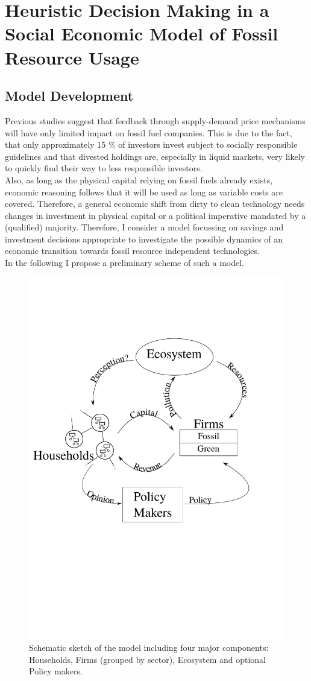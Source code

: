 \chapter{Heuristic Decision Making in a Social Economic Model of Fossil Resource Usage}
\section{Model Development} 

Previous studies \cite{Ans2013} suggest that feedback through supply-demand price mechanisms will have only limited impact on fossil fuel companies. This is due to the fact, that only approximately 15 \% of investors invest subject to socially responsible guidelines \cite{SIF2014Report} and that divested holdings are, especially in liquid markets, very likely to quickly find their way to less responsible investors. \\
Also, as long as the physical capital relying on fossil fuels already exists, economic reasoning follows that it will be used as long as variable costs are covered.
Therefore, a general economic shift from dirty to clean technology needs changes in investment in physical capital or a political imperative mandated by a (qualified) majority. Therefore, I consider a model focussing on savings and investment decisions appropriate to investigate the possible dynamics of an economic transition towards fossil resource independent technologies.\\
In the following I propose a preliminary scheme of such a model.

\begin{figure}[t]
	\centering
	\includegraphics[width =.7 \textwidth]{figures/Model_Scheme.pdf}
	\caption{Schematic sketch of the model including four major components: Households, Firms (grouped by sector), Ecosystem and optional Policy makers.}
	\label{fig:model}
\end{figure}

